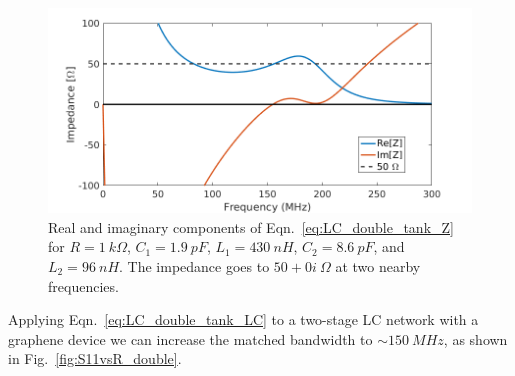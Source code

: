 \begin{figure}
\centering
\includegraphics[width=120mm]{figures/Johnson_noise_thermometry/Z_doubleTank.png}
\caption{Real and imaginary components of Eqn.~\ref{eq:LC_double_tank_Z} for $R=1~k\Omega$, $C_1=1.9~pF$, $L_1=430~nH$, $C_2=8.6~pF$, and $L_2=96~nH$. The impedance goes to $50+0i~\Omega$ at two nearby frequencies.}
\label{fig:LC_double_tank_Z}
\end{figure}
Applying Eqn.~\ref{eq:LC_double_tank_LC} to a two-stage LC network with a graphene device we can increase the matched bandwidth to ${\sim}150~MHz$, as shown in Fig.~\ref{fig:S11vsR_double}.

